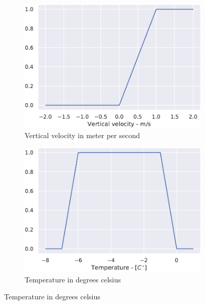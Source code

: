 \begin{figure}
    \centering
    \begin{subfigure}{.45\textwidth}
    \centering
    \includegraphics[width = \textwidth]{Figures/Wvar.pdf}
    \caption{Vertical velocity in meter per second}
    \label{fig:vertical velocity}
    \end{subfigure}
    \begin{subfigure}{.45\textwidth}
    \centering
    \includegraphics[width = \textwidth]{Figures/Tvar.pdf}
    \caption{Temperature in degrees celsius}
    \label{fig:temperature}
    \end{subfigure}
    

\end{figure}
